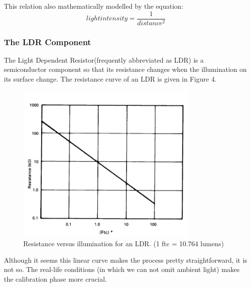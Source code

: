 \documentclass[letterpaper,12pt]{article}
\begin{document}
This relation also mathematically modelled by the equation:
\[light intensity  = \frac{1}{distance^2}\]
\subsubsection{The LDR Component}
The Light Dependent Resistor(frequently abbreviated as LDR) is a semiconductor component so that its resistance changes when the illumination on its surface change. The resistance curve of an LDR is given in Figure 4.
\begin{figure}[H]
	\centering
   \includegraphics[width=0.8\textwidth]{resistance-illum.png}
   \caption{Resistance versus illumination for an LDR. (1 ftc = 10.764 lumens)}
\end{figure} 
Although it seems this linear curve makes the process pretty straightforward, it is not so. The real-life conditions (in which we can not omit ambient light) makes the calibration phase more crucial.
\end{document}
